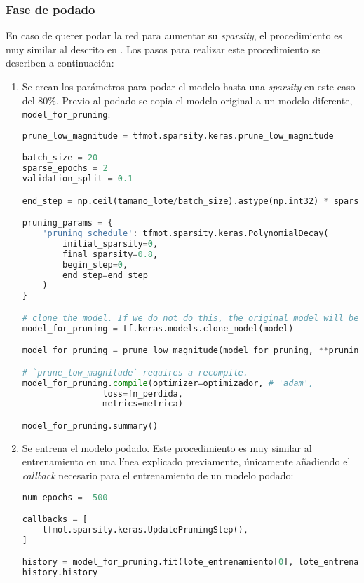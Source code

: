 \subsubsection{Fase de podado}
\label{sssec:modelo_pruebas_fase_podado}
En caso de querer podar la red para aumentar su \textit{sparsity}, el procedimiento es muy similar al descrito en \cite{tensorflow_prune_model}. Los pasos para realizar este procedimiento se describen a continuación:
\begin{enumerate}
    \item Se crean los parámetros para podar el modelo hasta una \textit{sparsity} en este caso del 80\%. Previo al podado se copia el modelo original a un modelo diferente, \texttt{model\_for\_pruning}:\medskip
\begin{lstlisting}[language=Python]
prune_low_magnitude = tfmot.sparsity.keras.prune_low_magnitude

batch_size = 20
sparse_epochs = 2
validation_split = 0.1

end_step = np.ceil(tamano_lote/batch_size).astype(np.int32) * sparse_epochs

pruning_params = {
    'pruning_schedule': tfmot.sparsity.keras.PolynomialDecay(
        initial_sparsity=0,                                                    
        final_sparsity=0.8,
        begin_step=0,
        end_step=end_step
    )
}

# clone the model. If we do not do this, the original model will be altered too
model_for_pruning = tf.keras.models.clone_model(model)

model_for_pruning = prune_low_magnitude(model_for_pruning, **pruning_params)

# `prune_low_magnitude` requires a recompile.
model_for_pruning.compile(optimizer=optimizador, # 'adam',
                loss=fn_perdida,
                metrics=metrica)

model_for_pruning.summary()
\end{lstlisting}
    \item Se entrena el modelo podado. Este procedimiento es muy similar al entrenamiento en una línea explicado previamente, únicamente añadiendo el \textit{callback} necesario para el entrenamiento de un modelo podado:\medskip
\begin{lstlisting}[language=Python]
num_epochs =  500

callbacks = [
    tfmot.sparsity.keras.UpdatePruningStep(),
]

history = model_for_pruning.fit(lote_entrenamiento[0], lote_entrenamiento[1], batch_size=batch_size, epochs=num_epochs, validation_split=validation_split, callbacks=callbacks)
history.history
\end{lstlisting}
\end{enumerate}


